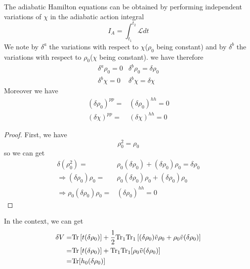   The adiabatic Hamilton equations can be obtained by performing independent variations of $\chi$ in the adiabatic action integral
  \begin{equation}
    I_A = \int_{t_1}^{t_2} \mathscr{L} dt\label{tdhf82}
  \end{equation}
  We note by $\delta^a$ the variations with respect to $\chi$($\rho_0$ being constant) and by $\delta^b$ the variations with respect to $\rho_0$($\chi$ being constant). we have therefore
  \begin{equation}
    \begin{array}{cc}
      \delta^a\rho_0 = 0 & \delta^b\rho_0 = \delta\rho_0\\  \label{tdhf83}
      \delta^b\chi = 0   & \delta^b\chi = \delta\chi
    \end{array}
  \end{equation}
  Moreover we have
  \begin{equation}
    \begin{aligned}
      (\delta\rho_0)^{pp} =& (\delta\rho_0)^{hh} = 0\\  \label{tdhf84}
      (\delta\chi)^{pp} =& (\delta\chi)^{hh} = 0
    \end{aligned}
  \end{equation}
  \begin{proof}
    First, we have 
    \begin{equation}
      \rho_0^2 = \rho_0 \label{tdhf85}
    \end{equation}
    so we can get
    \begin{equation}
      \begin{aligned}
        \delta(\rho_0^2) =& \rho_0(\delta\rho_0) + (\delta\rho_0)\rho_0 = \delta\rho_0 \\ \label{tdhf86}
        \Rightarrow  (\delta\rho_0)\rho_0 =&  \rho_0(\delta\rho_0)\rho_0 + (\delta\rho_0)\rho_0\\
        \Rightarrow \rho_0(\delta\rho_0)\rho_0 =& (\delta\rho_0)^{hh} = 0
      \end{aligned}
    \end{equation}
  \end{proof}
  In the context, we can get
  \begin{equation}
    \begin{aligned}
      \delta V =& {\rm Tr}\left[ t(\delta\rho_0) \right] + \frac{1}{2}{\rm Tr}_1{\rm Tr}_1\left[ (\delta\rho_0)\tilde{v}\rho_0  +\rho_0\tilde{v}(\delta\rho_0) \right]\\ \label{tdhf87}
      =& {\rm Tr}\left[ t(\delta\rho_0) \right] + {\rm Tr}_1{\rm Tr}_1[ \rho_0\tilde{v}(\delta\rho_0) ]\\
      =& {\rm Tr}[ h_0(\delta\rho_0) ]
    \end{aligned}
  \end{equation}
